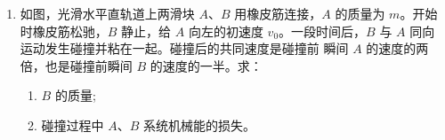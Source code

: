\begin{enumerate}
\begin{enumerate}
\item 
如图，光滑水平直轨道上两滑块 $ A $、$ B $ 用橡皮筋连接，$ A $ 的质量为 $ m $。开始时橡皮筋松驰，$ B $
静止，给 $ A $ 向左的初速度 $ v_{0} $。一段时间后，$ B $ 与 $ A $ 同向
运动发生碰撞并粘在一起。碰撞后的共同速度是碰撞前
瞬间 $ A $ 的速度的两倍，也是碰撞前瞬间 $ B $ 的速度的一半。求：
\begin{enumerate}
	\item
$ B $ 的质量;
\item 
碰撞过程中 $ A $、$ B $ 系统机械能的损失。
	
\end{enumerate}
\begin{figure}[h!]
	\flushright
	
\end{figure}



\end{enumerate}


	
	
	
\end{enumerate}

